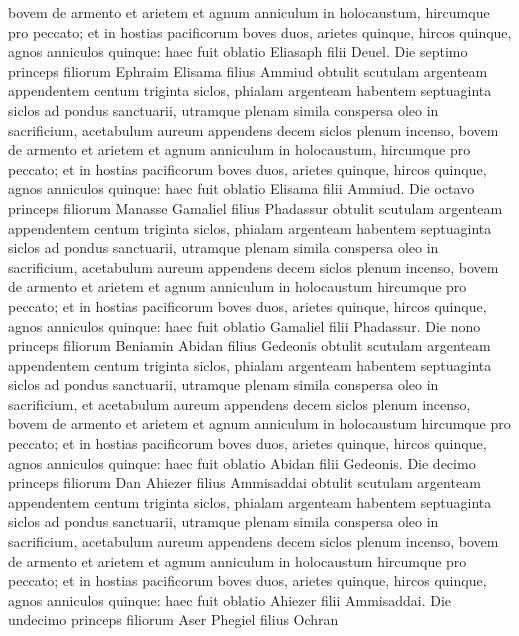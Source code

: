 \begin{biblechapter}
\begin{biblechapter}
\begin{biblechapter}
\begin{biblechapter}
\begin{biblechapter}
\begin{biblechapter}
\begin{biblechapter}
 \verse bovem de armento et arietem et agnum anniculum in holocaustum, 
\verse hircumque pro peccato; 
\verse et in hostias pacificorum boves duos, arietes quinque, hircos quinque, agnos anniculos quinque: haec fuit oblatio Eliasaph filii Deuel.
 \verse Die septimo princeps filiorum Ephraim Elisama filius Ammiud 
\verse obtulit scutulam argenteam appendentem centum triginta siclos, phialam argenteam habentem septuaginta siclos ad pondus sanctuarii, utramque plenam simila conspersa oleo in sacrificium, 
\verse acetabulum aureum appendens decem siclos plenum incenso, 
\verse bovem de armento et arietem et agnum anniculum in holocaustum, 
\verse hircumque pro peccato; 
\verse et in hostias pacificorum boves duos, arietes quinque, hircos quinque, agnos anniculos quinque: haec fuit oblatio Elisama filii Ammiud.
 \verse Die octavo princeps filiorum Manasse Gamaliel filius Phadassur 
\verse obtulit scutulam argenteam appendentem centum triginta siclos, phialam argenteam habentem septuaginta siclos ad pondus sanctuarii, utramque plenam simila conspersa oleo in sacrificium, 
\verse acetabulum aureum appendens decem siclos plenum incenso, 
\verse bovem de armento et arietem et agnum anniculum in holocaustum 
\verse hircumque pro peccato; 
\verse et in hostias pacificorum boves duos, arietes quinque, hircos quinque, agnos anniculos quinque: haec fuit oblatio Gamaliel filii Phadassur.
 \verse Die nono princeps filiorum Beniamin Abidan filius Gedeonis 
\verse obtulit scutulam argenteam appendentem centum triginta siclos, phialam argenteam habentem septuaginta siclos ad pondus sanctuarii, utramque plenam simila conspersa oleo in sacrificium, 
\verse et acetabulum aureum appendens decem siclos plenum incenso, 
\verse bovem de armento et arietem et agnum anniculum in holocaustum 
\verse hircumque pro peccato; 
\verse et in hostias pacificorum boves duos, arietes quinque, hircos quinque, agnos anniculos quinque: haec fuit oblatio Abidan filii Gedeonis.
 \verse Die decimo princeps filiorum Dan Ahiezer filius Ammisaddai 
\verse obtulit scutulam argenteam appendentem centum triginta siclos, phialam argenteam habentem septuaginta siclos ad pondus sanctuarii, utramque plenam simila conspersa oleo in sacrificium, 
\verse acetabulum aureum appendens decem siclos plenum incenso, 
\verse bovem de armento et arietem et agnum anniculum in holocaustum 
\verse hircumque pro peccato; 
\verse et in hostias pacificorum boves duos, arietes quinque, hircos quinque, agnos anniculos quinque: haec fuit oblatio Ahiezer filii Ammisaddai.
 \verse Die undecimo princeps filiorum Aser Phegiel filius Ochran 

\end{biblechapter}
\end{biblechapter}
\end{biblechapter}
\end{biblechapter}
\end{biblechapter}
\end{biblechapter}
\end{biblechapter}
